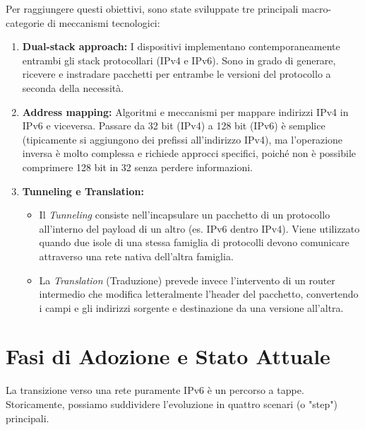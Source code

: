Per raggiungere questi obiettivi, sono state sviluppate tre principali macro-categorie di meccanismi tecnologici:
\begin{enumerate}
\item \textbf{Dual-stack approach:} I dispositivi implementano contemporaneamente entrambi gli stack protocollari (IPv4 e IPv6). Sono in grado di generare, ricevere e instradare pacchetti per entrambe le versioni del protocollo a seconda della necessità.
\item \textbf{Address mapping:} Algoritmi e meccanismi per mappare indirizzi IPv4 in IPv6 e viceversa. Passare da 32 bit (IPv4) a 128 bit (IPv6) è semplice (tipicamente si aggiungono dei prefissi all'indirizzo IPv4), ma l'operazione inversa è molto complessa e richiede approcci specifici, poiché non è possibile comprimere 128 bit in 32 senza perdere informazioni.
\item \textbf{Tunneling e Translation:}
\begin{itemize}
\item Il \textit{Tunneling} consiste nell'incapsulare un pacchetto di un protocollo all'interno del payload di un altro (es. IPv6 dentro IPv4). Viene utilizzato quando due isole di una stessa famiglia di protocolli devono comunicare attraverso una rete nativa dell'altra famiglia.
\item La \textit{Translation} (Traduzione) prevede invece l'intervento di un router intermedio che modifica letteralmente l'header del pacchetto, convertendo i campi e gli indirizzi sorgente e destinazione da una versione all'altra.
\end{itemize}
\end{enumerate}

\section{Fasi di Adozione e Stato Attuale}
La transizione verso una rete puramente IPv6 è un percorso a tappe. Storicamente, possiamo suddividere l'evoluzione in quattro scenari (o "step") principali.


